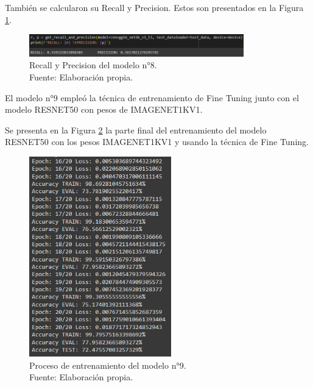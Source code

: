 También se calcularon su Recall y Precision. Estos son presentados en la Figura \ref{4:fig135}.

\begin{figure}[H]
	\begin{center}
		\includegraphics[width=0.83\textwidth]{4/figures/model8_rp.PNG}
		\caption[Recall y Precision del modelo n°8]{Recall y Precision del modelo n°8. \\
		Fuente: Elaboración propia.}
		\label{4:fig135}
	\end{center}
\end{figure}

El modelo n°9 empleó la técnica de entrenamiento de Fine Tuning junto con el modelo RESNET50 con pesos de IMAGENET1KV1.

Se presenta en la Figura \ref{4:fig136} la parte final del entrenamiento del modelo RESNET50 con los pesos IMAGENET1KV1 y usando la técnica de Fine Tuning.

\begin{figure}[H]
	\begin{center}
		\includegraphics[width=0.55\textwidth]{4/figures/model9_train.PNG}
		\caption[Proceso de entrenamiento del modelo n°9]{Proceso de entrenamiento del modelo n°9. \\
		Fuente: Elaboración propia.}
		\label{4:fig136}
	\end{center}
\end{figure}

